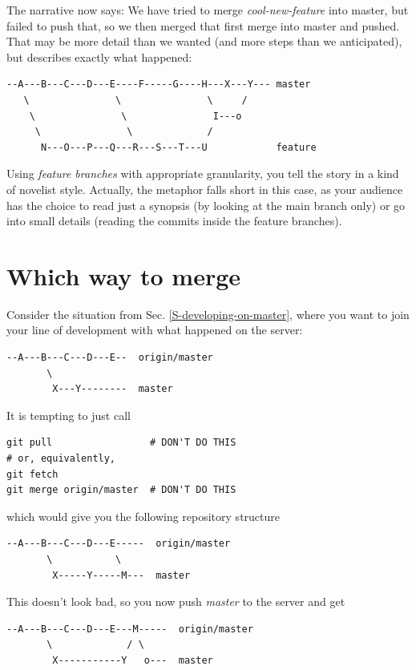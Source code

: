 \documentclass[12pt,pdftex]{article}
\begin{document}
The narrative now says:
We have tried to merge \emph{cool-new-feature} into master, but failed to
push that, so we then merged that first merge into master and pushed.
That may be more detail than we wanted (and more steps than we
anticipated), but describes exactly what happened:

\begin{verbatim}
--A---B---C---D---E----F-----G----H---X---Y--- master
   \               \               \     /
    \               \               I---o
     \               \             /
      N---O---P---Q---R---S---T---U            feature
\end{verbatim}


\bigskip


Using \emph{feature branches} with appropriate granularity, you tell the
story in a kind of novelist style.
Actually, the metaphor falls short in this case, as your audience has
the choice to read just a synopsis (by looking at the main branch only)
or go into small details (reading the commits inside the feature
branches).


\appendix



\section{Which way to merge}
\label{sec-6}
\label{Section-which-way-to-merge}

Consider the situation from Sec. \ref{S-developing-on-master}, where
you want to join your line of development with what happened on the
server:
\begin{verbatim}
--A---B---C---D---E--  origin/master
       \
        X---Y--------  master
\end{verbatim}

It is tempting to just call
\lstset{frame=single,basicstyle=\ttfamily\footnotesize,language=sh,label= ,caption= ,captionpos=b,numbers=none}
\begin{lstlisting}
git pull                 # DON'T DO THIS
# or, equivalently,
git fetch
git merge origin/master  # DON'T DO THIS
\end{lstlisting}
which would give you the following repository structure
\begin{verbatim}
--A---B---C---D---E-----  origin/master
       \           \
        X-----Y-----M---  master
\end{verbatim}
This doesn't look bad, so you now push \emph{master} to the server and get
\begin{verbatim}
--A---B---C---D---E---M-----  origin/master
       \             / \
        X-----------Y   o---  master
\end{verbatim}
\end{document}
